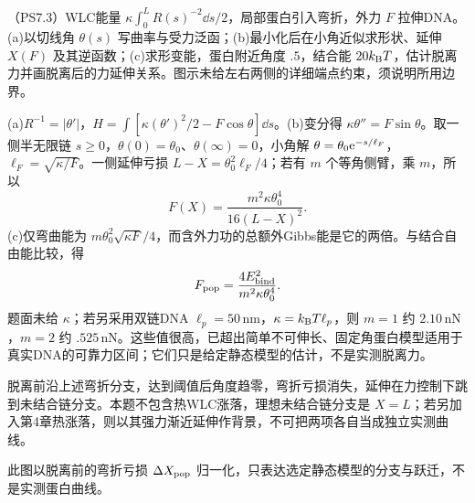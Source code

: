 \begin{exercise}
（PS7.3）WLC能量 $\kappa\int_0^L R(s)^{-2}\dd s/2$，局部蛋白引入弯折，外力 $F$ 拉伸DNA。(a)以切线角 $\theta(s)$ 写曲率与受力泛函；(b)最小化后在小角近似求形状、延伸 $X(F)$ 及其逆函数；(c)求形变能，蛋白附近角度 $.5$，结合能 $20k_{\mathrm B} T$，估计脱离力并画脱离后的力延伸关系。图示未给左右两侧的详细端点约束，须说明所用边界。
\end{exercise}
\begin{solution}
(a)$R^{-1}=|\theta'|$，$H=\int[\kappa(\theta')^2/2-F\cos\theta]\dd s$。(b)变分得 $\kappa\theta''=F\sin\theta$。取一侧半无限链 $s\ge0$，$\theta(0)=\theta_0$、$\theta(\infty)=0$，小角解 $\theta=\theta_0\mathrm e^{-s/\ell_F}$，$\ell_F=\sqrt{\kappa/F}$。一侧延伸亏损 $L-X=\theta_0^2\ell_F/4$；若有 $m$ 个等角侧臂，乘 $m$，所以
\[
F(X)=\frac{m^2\kappa\theta_0^4}{16(L-X)^2}.
\]
(c)仅弯曲能为 $m\theta_0^2\sqrt{\kappa F}/4$，而含外力功的总额外Gibbs能是它的两倍。与结合自由能比较，得 \[F_{\rm pop}=\frac{4E_{\rm bind}^2}{m^2\kappa\theta_0^4}.\]题面未给 $\kappa$；若另采用双链DNA $\ell_p=50\,\mathrm{nm}$，$\kappa=k_{\mathrm B} T\ell_p$，则 $m=1$ 约 $2.10\,\mathrm{nN}$，$m=2$ 约 $.525\,\mathrm{nN}$。这些值很高，已超出简单不可伸长、固定角蛋白模型适用于真实DNA的可靠力区间；它们只是给定静态模型的估计，不是实测脱离力。

脱离前沿上述弯折分支，达到阈值后角度趋零，弯折亏损消失，延伸在力控制下跳到未结合链分支。本题不包含热WLC涨落，理想未结合链分支是 $X=L$；若另加入第4章热涨落，则以其强力渐近延伸作背景，不可把两项各自当成独立实测曲线。
\begin{center}\end{center}
此图以脱离前的弯折亏损 $\Delta X_{\rm pop}$ 归一化，只表达选定静态模型的分支与跃迁，不是实测蛋白曲线。

\end{solution}

